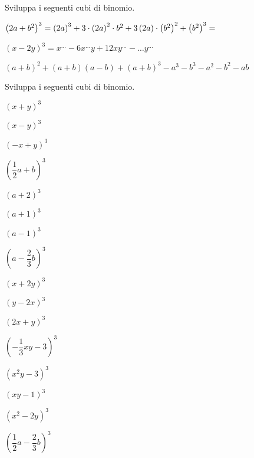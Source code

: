 \begin{esercizio}
 \label{ese:11.25}
 Sviluppa i seguenti cubi di binomio.

 \begin{enumeratea}
\item $ 
\left(2a+b^{2}\right)^{3}=\left(2a\right)^{3}+3\cdot\left(2a\right)^{2}\cdot 
b^{2}+3\left(2a\right)\cdot\left(b^{2}\right)^{2}+\left(b^{2}\right)^{3}
=\dotfill~$
\item $\left(x-2y\right)^{3}=x^{\ldots }-6x^{\ldots }y+12{xy}^{\ldots}-\ldots 
y^{\ldots }$
\item $(a+b)^{2}+(a+b)(a-b)+(a+b)^{3}-a^{3}-b^{3}-a^{2}-b^{2}-{ab}$
\end{enumeratea}
\end{esercizio}


\begin{esercizio}
 \label{ese:11.26}
 Sviluppa i seguenti cubi di binomio.
\begin{multicols}{4}
 \begin{enumeratea}
 \item $\left(x+y\right)^{3}$
 \item $\left(x-y\right)^{3}$
 \item $\left(-x+y\right)^{3}$
 \item $\left(\dfrac{1}{2}a+b\right)^{3}$
 \item $\left(a+2\right)^{3}$
 \item $\left(a+1\right)^{3}$
 \item $\left(a-1\right)^{3}$
 \item $\left(a-\dfrac{2}{3}b\right)^{3}$
 \item $\left(x+2y\right)^{3}$
 \item $\left(y-2x\right)^{3}$
 \item $\left(2x+y\right)^{3}$
 \item $\left(-\dfrac{1}{3}xy-3\right)^{3}$
 \item $\left(x^{2}y-3\right)^{3}$
 \item $\left(xy-1\right)^{3}$
 \item $\left(x^{2}-2y\right)^{3}$
 \item $\left(\dfrac{1}{2}a-\dfrac{2}{3}b\right)^{3}$
 \end{enumeratea}
\end{multicols}
\end{esercizio}

